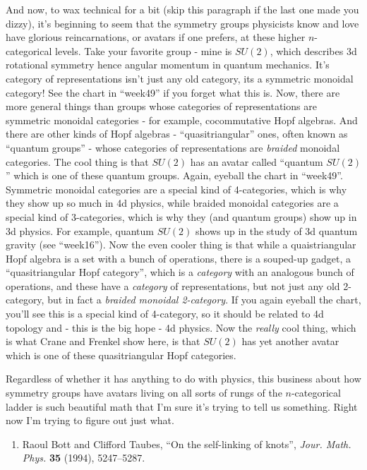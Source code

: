 \documentclass{article}
\def\tightlist{}
\begin{document}
And now, to wax technical for a bit (skip this paragraph if the last one
made you dizzy), it's beginning to seem that the symmetry groups
physicists know and love have glorious reincarnations, or avatars if one
prefers, at these higher \(n\)-categorical levels. Take your favorite
group - mine is \(SU(2)\), which describes 3d rotational symmetry hence
angular momentum in quantum mechanics. It's category of representations
isn't just any old category, its a symmetric monoidal category! See the
chart in ``week49'' if you forget what this is. Now, there are more
general things than groups whose categories of representations are
symmetric monoidal categories - for example, cocommutative Hopf
algebras. And there are other kinds of Hopf algebras -
``quasitriangular'' ones, often known as ``quantum groups'' - whose
categories of representations are \emph{braided} monoidal categories.
The cool thing is that \(SU(2)\) has an avatar called ``quantum
\(SU(2)\)'' which is one of these quantum groups. Again, eyeball the
chart in ``week49''. Symmetric monoidal categories are a special kind of
4-categories, which is why they show up so much in 4d physics, while
braided monoidal categories are a special kind of 3-categories, which is
why they (and quantum groups) show up in 3d physics. For example,
quantum \(SU(2)\) shows up in the study of 3d quantum gravity (see
``week16''). Now the even cooler thing is that while a quaistriangular
Hopf algebra is a set with a bunch of operations, there is a souped-up
gadget, a ``quasitriangular Hopf category'', which is a \emph{category}
with an analogous bunch of operations, and these have a \emph{category}
of representations, but not just any old 2-category, but in fact a
\emph{braided monoidal 2-category}. If you again eyeball the chart,
you'll see this is a special kind of 4-category, so it should be related
to 4d topology and - this is the big hope - 4d physics. Now the
\emph{really} cool thing, which is what Crane and Frenkel show here, is
that \(SU(2)\) has yet another avatar which is one of these
quasitriangular Hopf categories.

Regardless of whether it has anything to do with physics, this business
about how symmetry groups have avatars living on all sorts of rungs of
the \(n\)-categorical ladder is such beautiful math that I'm sure it's
trying to tell us something. Right now I'm trying to figure out just
what.

\begin{enumerate}
\def\labelenumi{\arabic{enumi})}
\setcounter{enumi}{2}
\tightlist
\item
  Raoul Bott and Clifford Taubes, ``On the self-linking of knots'',
  \emph{Jour. Math. Phys.} \textbf{35} (1994), 5247--5287.
\end{enumerate}
\end{document}
